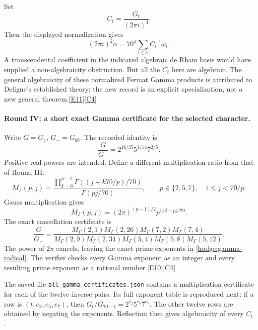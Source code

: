 \documentclass[11pt]{article}
\newcommand{\src}[1]{\hyperlink{src:#1}{[#1]}}
\begin{document}
Set
\[
 C_t=\frac{G_t}{(2\pi i)^3}.
\]
Then the displayed normalization gives
\begin{equation}\label{hodge:tate-normalization}
 (2\pi i)^2\alpha
 =70^4\sum_{t\in U}C_t^{-1}\omega_t.
\end{equation}
A transcendental coefficient in the indicated algebraic de Rham basis would
have supplied a non-algebraicity obstruction. But all the $C_t$ here are
algebraic. The general algebraicity of these normalized Fermat Gamma
products is attributed to Deligne's established theory; the new record is
an explicit specialization, not a new general theorem.\src{E11}\src{C4}

\paragraph{Round IV: a short exact Gamma certificate for the selected character.}
Write $G=G_1$, $G_-=G_{69}$. The recorded identity is
\begin{equation}\label{hodge:gamma-radical}
 \boxed{\quad \frac{G}{G_-}
  =2^{16/35}5^{3/14}7^{2/5}.\quad}
\end{equation}
Positive real powers are intended. Define a different multiplication ratio
from that of Round III:
\[
 M_\Gamma(p,j)=
 \frac{\prod_{k=0}^{p-1}\Gamma((j+k70/p)/70)}{\Gamma(pj/70)},
 \qquad p\in\{2,5,7\},\quad1\le j<70/p.
\]
Gauss multiplication gives
\[
 M_\Gamma(p,j)=(2\pi)^{(p-1)/2}p^{1/2-pj/70}.
\]
The exact cancellation certificate is
\begin{equation}\label{hodge:short-gamma-certificate}
 \frac{G}{G_-}
 =\frac{M_\Gamma(2,1)M_\Gamma(2,26)M_\Gamma(7,2)M_\Gamma(7,4)}
 {M_\Gamma(2,9)M_\Gamma(2,34)
  M_\Gamma(5,4)M_\Gamma(5,8)M_\Gamma(5,12)}.
\end{equation}
The power of $2\pi$ cancels, leaving the exact prime exponents in
\eqref{hodge:gamma-radical}. The verifier checks every Gamma exponent as an
integer and every resulting prime exponent as a rational number.\src{E10}\src{C4}

The saved file \texttt{all\_gamma\_certificates.json} contains a multiplication
certificate for each of the twelve inverse pairs. Its full exponent table
is reproduced next: if a row is $(t,e_2,e_5,e_7)$, then
$G_t/G_{70-t}=2^{e_2}5^{e_5}7^{e_7}$. The other twelve rows are obtained by
negating the exponents. Reflection then gives algebraicity of every $C_t$.
\end{document}
